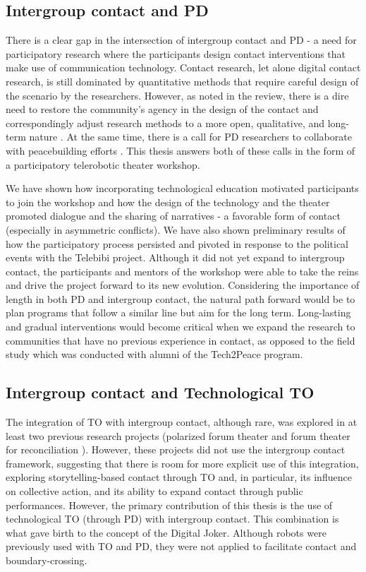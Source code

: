 \documentclass[dissertation,math,vertlayout,pdfa,colorlinks]{aaltoseries}
\begin{document}
\subsection{Intergroup contact and PD}
There is a clear gap in the intersection of intergroup contact and PD - a need for participatory research where the participants design contact interventions that make use of communication technology. Contact research, let alone digital contact research, is still dominated by quantitative methods that require careful design of the scenario by the researchers. However, as noted in the review, there is a dire need to restore the community's agency in the design of the contact and correspondingly adjust research methods to a more open, qualitative, and long-term nature \cite{dixonNegativeContactCollective2021}. At the same time, there is a call for PD researchers to collaborate with peacebuilding efforts \cite{bodkerAfterthoughtsEmergentFuture2025}. This thesis answers both of these calls in the form of a participatory telerobotic theater workshop. 

We have shown how incorporating technological education motivated participants to join the workshop and how the design of the technology and the theater promoted dialogue and the sharing of narratives - a favorable form of contact (especially in asymmetric conflicts). We have also shown preliminary results of how the participatory process persisted and pivoted in response to the political events with the Telebibi project. Although it did not yet expand to intergroup contact, the participants and mentors of the workshop were able to take the reins and drive the project forward to its new evolution. Considering the importance of length in both PD and intergroup contact, the natural path forward would be to plan programs that follow a similar line but aim for the long term. Long-lasting and gradual interventions would become critical when we expand the research to communities that have no previous experience in contact, as opposed to the field study which was conducted with alumni of the Tech2Peace program.

\subsection{Intergroup contact and Technological TO}
The integration of TO with intergroup contact, although rare, was explored in at least two previous research projects (polarized forum theater \cite{alonCHAPTERFOURTEENNonViolent2011} and forum theater for reconciliation \cite{miramontiForumTheatreReconciliation2025}). However, these projects did not use the intergroup contact framework, suggesting that there is room for more explicit use of this integration, exploring storytelling-based contact through TO and, in particular, its influence on collective action, and its ability to expand contact through public performances. However, the primary contribution of this thesis is the use of technological TO (through PD) with intergroup contact. This combination is what gave birth to the concept of the Digital Joker. Although robots were previously used with TO and PD, they were not applied to facilitate contact and boundary-crossing.
\end{document}
